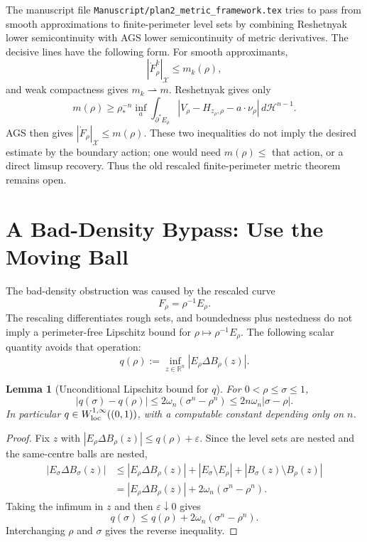 \documentclass[11pt]{article}
\newtheorem{lemma}[theorem]{Lemma}
\theoremstyle{definition}
\newcommand{\R}{\mathbb R}
\newcommand{\X}{\mathcal X}
\newcommand{\HH}{\mathcal H}
\newcommand{\eps}{\varepsilon}
\begin{document}
The manuscript file \texttt{Manuscript/plan2\_metric\_framework.tex} tries to
pass from smooth approximations to finite-perimeter level sets by combining
Reshetnyak lower semicontinuity with AGS lower semicontinuity of metric
derivatives.  The decisive lines have the following form.  For smooth
approximants,
\[
   |\dot F^k_\rho|_\X\le m_k(\rho),
\]
and weak compactness gives \(m_k\rightharpoonup m\).  Reshetnyak gives only
\[
   m(\rho)\ge
   \rho_*^{-n}\inf_a
   \int_{\partial^*E_\rho}
   |V_\rho-H_{z_\rho,\rho}-a\cdot\nu_\rho|\,d\HH^{n-1}.
\]
AGS then gives \(|\dot F_\rho|_\X\le m(\rho)\).  These two inequalities do
not imply the desired estimate by the boundary action; one would need
\(m(\rho)\le\) that action, or a direct limsup recovery.  Thus the old
rescaled finite-perimeter metric theorem remains open.

\section{A Bad-Density Bypass: Use the Moving Ball}

The bad-density obstruction was caused by the rescaled curve
\[
   F_\rho=\rho^{-1}E_\rho .
\]
The rescaling differentiates rough sets, and boundedness plus nestedness do
not imply a perimeter-free Lipschitz bound for
\(\rho\mapsto \rho^{-1}E_\rho\).  The following scalar quantity avoids that
operation:
\begin{equation}\label{eq:q-def}
   q(\rho):=\inf_{z\in\R^n}|E_\rho\Delta B_\rho(z)|.
\end{equation}

\begin{lemma}[Unconditional Lipschitz bound for \(q\)]\label{lem:qLip}
For \(0<\rho\le\sigma\le1\),
\[
   |q(\sigma)-q(\rho)|
   \le 2\omega_n(\sigma^n-\rho^n)
   \le 2n\omega_n|\sigma-\rho|.
\]
In particular \(q\in W^{1,\infty}_{\rm loc}((0,1))\), with a computable
constant depending only on \(n\).
\end{lemma}

\begin{proof}
Fix \(z\) with
\(|E_\rho\Delta B_\rho(z)|\le q(\rho)+\eps\).  Since the level sets are
nested and the same-centre balls are nested,
\[
\begin{aligned}
   |E_\sigma\Delta B_\sigma(z)|
   &\le |E_\rho\Delta B_\rho(z)|
      +|E_\sigma\setminus E_\rho|+|B_\sigma(z)\setminus B_\rho(z)|  \\
   &= |E_\rho\Delta B_\rho(z)|
      +2\omega_n(\sigma^n-\rho^n).
\end{aligned}
\]
Taking the infimum in \(z\) and then \(\eps\downarrow0\) gives
\[
   q(\sigma)\le q(\rho)+2\omega_n(\sigma^n-\rho^n).
\]
Interchanging \(\rho\) and \(\sigma\) gives the reverse inequality.
\end{proof}
\end{document}

